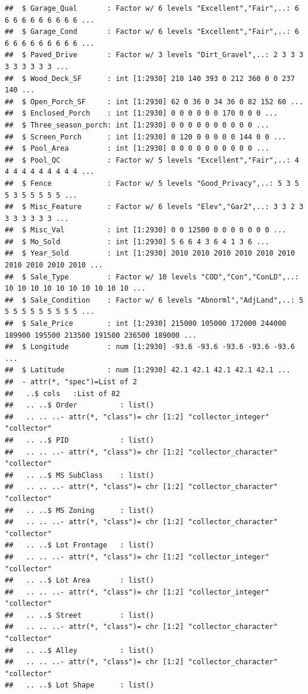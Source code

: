 \documentclass[
]{book}
\theoremstyle{definition}
\theoremstyle{definition}
\theoremstyle{definition}
\theoremstyle{definition}
\theoremstyle{remark}
\begin{document}
\begin{verbatim}
##  $ Garage_Qual       : Factor w/ 6 levels "Excellent","Fair",..: 6 6 6 6 6 6 6 6 6 6 ...
##  $ Garage_Cond       : Factor w/ 6 levels "Excellent","Fair",..: 6 6 6 6 6 6 6 6 6 6 ...
##  $ Paved_Drive       : Factor w/ 3 levels "Dirt_Gravel",..: 2 3 3 3 3 3 3 3 3 3 ...
##  $ Wood_Deck_SF      : int [1:2930] 210 140 393 0 212 360 0 0 237 140 ...
##  $ Open_Porch_SF     : int [1:2930] 62 0 36 0 34 36 0 82 152 60 ...
##  $ Enclosed_Porch    : int [1:2930] 0 0 0 0 0 0 170 0 0 0 ...
##  $ Three_season_porch: int [1:2930] 0 0 0 0 0 0 0 0 0 0 ...
##  $ Screen_Porch      : int [1:2930] 0 120 0 0 0 0 0 144 0 0 ...
##  $ Pool_Area         : int [1:2930] 0 0 0 0 0 0 0 0 0 0 ...
##  $ Pool_QC           : Factor w/ 5 levels "Excellent","Fair",..: 4 4 4 4 4 4 4 4 4 4 ...
##  $ Fence             : Factor w/ 5 levels "Good_Privacy",..: 5 3 5 5 3 5 5 5 5 5 ...
##  $ Misc_Feature      : Factor w/ 6 levels "Elev","Gar2",..: 3 3 2 3 3 3 3 3 3 3 ...
##  $ Misc_Val          : int [1:2930] 0 0 12500 0 0 0 0 0 0 0 ...
##  $ Mo_Sold           : int [1:2930] 5 6 6 4 3 6 4 1 3 6 ...
##  $ Year_Sold         : int [1:2930] 2010 2010 2010 2010 2010 2010 2010 2010 2010 2010 ...
##  $ Sale_Type         : Factor w/ 10 levels "COD","Con","ConLD",..: 10 10 10 10 10 10 10 10 10 10 ...
##  $ Sale_Condition    : Factor w/ 6 levels "Abnorml","AdjLand",..: 5 5 5 5 5 5 5 5 5 5 ...
##  $ Sale_Price        : int [1:2930] 215000 105000 172000 244000 189900 195500 213500 191500 236500 189000 ...
##  $ Longitude         : num [1:2930] -93.6 -93.6 -93.6 -93.6 -93.6 ...
##  $ Latitude          : num [1:2930] 42.1 42.1 42.1 42.1 42.1 ...
##  - attr(*, "spec")=List of 2
##   ..$ cols   :List of 82
##   .. ..$ Order          : list()
##   .. .. ..- attr(*, "class")= chr [1:2] "collector_integer" "collector"
##   .. ..$ PID            : list()
##   .. .. ..- attr(*, "class")= chr [1:2] "collector_character" "collector"
##   .. ..$ MS SubClass    : list()
##   .. .. ..- attr(*, "class")= chr [1:2] "collector_character" "collector"
##   .. ..$ MS Zoning      : list()
##   .. .. ..- attr(*, "class")= chr [1:2] "collector_character" "collector"
##   .. ..$ Lot Frontage   : list()
##   .. .. ..- attr(*, "class")= chr [1:2] "collector_integer" "collector"
##   .. ..$ Lot Area       : list()
##   .. .. ..- attr(*, "class")= chr [1:2] "collector_integer" "collector"
##   .. ..$ Street         : list()
##   .. .. ..- attr(*, "class")= chr [1:2] "collector_character" "collector"
##   .. ..$ Alley          : list()
##   .. .. ..- attr(*, "class")= chr [1:2] "collector_character" "collector"
##   .. ..$ Lot Shape      : list()

\end{verbatim}
\end{document}
